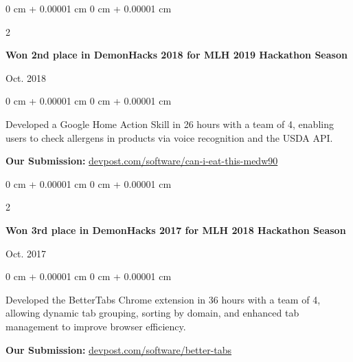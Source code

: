 \documentclass[10pt, letterpaper]{article}
\newenvironment{onecolentry}{
    \begin{adjustwidth}{
        0 cm + 0.00001 cm
    }{
        0 cm + 0.00001 cm
    }
}{
    \end{adjustwidth}
} %
\newenvironment{twocolentry}[2][]{
    \onecolentry
    \def\secondColumn{#2}
    \setcolumnwidth{\fill, 5 cm}
    \begin{paracol}{2}
}{
    \switchcolumn \raggedleft \secondColumn
    \end{paracol}
    \endonecolentry
} %
\begin{document}
        
        \begin{samepage}
            \begin{twocolentry}{
                Oct. 2018
            }
                \textbf{Won 2nd place in DemonHacks 2018 for MLH 2019 Hackathon Season}
            \end{twocolentry}

            \vspace{0.10 cm}
            
            \begin{onecolentry}
                Developed a Google Home Action Skill in 26 hours with a team of 4, enabling users to check allergens in products via voice recognition and the USDA API.

                \vspace{0.10 cm}
                
        \textbf{Our Submission:} \href{https://devpost.com/software/can-i-eat-this-medw90}{devpost.com/software/can-i-eat-this-medw90}
        \end{onecolentry}
        \end{samepage}

        \vspace{0.2 cm}

        \begin{samepage}
            \begin{twocolentry}{
                Oct. 2017
            }
                \textbf{Won 3rd place in DemonHacks 2017 for MLH 2018 Hackathon Season}
            \end{twocolentry}

            \vspace{0.10 cm}
            
            \begin{onecolentry}
                Developed the BetterTabs Chrome extension in 36 hours with a team of 4, allowing dynamic tab grouping, sorting by domain, and enhanced tab management to improve browser efficiency.

                \vspace{0.10 cm}
                
        \textbf{Our Submission:} \href{https://devpost.com/software/better-tabs}{devpost.com/software/better-tabs}
        \end{onecolentry}
        \end{samepage}


    
\end{document}
